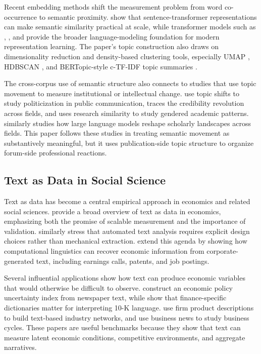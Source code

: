 \documentclass[11pt]{article}
\begin{document}
Recent embedding methods shift the measurement problem from word co-occurrence to semantic proximity. \citet{reimers2019} show that sentence-transformer representations can make semantic similarity practical at scale, while transformer models such as \citet{vaswani2017}, \citet{brown2020}, and \citet{ouyang2022} provide the broader language-modeling foundation for modern representation learning. The paper's topic construction also draws on dimensionality reduction and density-based clustering tools, especially UMAP \citep{mcinnes2018umap}, HDBSCAN \citep{campello2013hdbscan,mcinnes2017hdbscan}, and BERTopic-style c-TF-IDF topic summaries \citep{grootendorst2022bertopic}.

The cross-corpus use of semantic structure also connects to studies that use topic movement to measure institutional or intellectual change. \citet{locatelli2023} use topic shifts to study politicization in public communication, \citet{goldsmithpinkham2024} traces the credibility revolution across fields, and \citet{bello2025} uses research similarity to study gendered academic patterns. \citet{pramanick2026} similarly studies how large language models reshape scholarly landscapes across fields. This paper follows these studies in treating semantic movement as substantively meaningful, but it uses publication-side topic structure to organize forum-side professional reactions.

\subsection{Text as Data in Social Science}

Text as data has become a central empirical approach in economics and related social sciences. \citet{gentzkow2019} provide a broad overview of text as data in economics, emphasizing both the promise of scalable measurement and the importance of validation. \citet{grimmer2013} similarly stress that automated text analysis requires explicit design choices rather than mechanical extraction. \citet{hassan2025} extend this agenda by showing how computational linguistics can recover economic information from corporate-generated text, including earnings calls, patents, and job postings.

Several influential applications show how text can produce economic variables that would otherwise be difficult to observe. \citet{baker2016} construct an economic policy uncertainty index from newspaper text, while \citet{loughran2011} show that finance-specific dictionaries matter for interpreting 10-K language. \citet{hoberg2016} use firm product descriptions to build text-based industry networks, and \citet{xiu2024} use business news to study business cycles. These papers are useful benchmarks because they show that text can measure latent economic conditions, competitive environments, and aggregate narratives.
\end{document}
